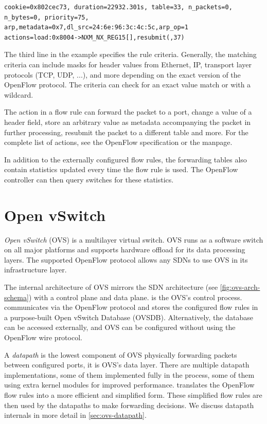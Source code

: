 \begin{verbatim}
cookie=0x802cec73, duration=22932.301s, table=33, n_packets=0,
n_bytes=0, priority=75,
arp,metadata=0x7,dl_src=24:6e:96:3c:4c:5c,arp_op=1
actions=load:0x8004->NXM_NX_REG15[],resubmit(,37)
\end{verbatim}

The third line in the example specifies the rule criteria. Generally, the matching criteria can include masks for header values from Ethernet, IP, transport layer protocols (TCP, UDP, ...), and more depending on the exact version of the OpenFlow protocol. The criteria can check for an exact value match or with a wildcard.

The action in a flow rule can forward the packet to a port, change a value of a header field, store an arbitrary value as metadata accompanying the packet in further processing, resubmit the packet to a different table and more. For the complete list of actions, see the OpenFlow specification  or the  manpage.

In addition to the externally configured flow rules, the forwarding tables also contain statistics updated every time the flow rule is used. The OpenFlow controller can then query switches for these statistics.

\section{Open vSwitch}
\label{sec:ovs}

\emph{Open vSwitch} (OVS) is a multilayer virtual switch. OVS runs as a software switch on all major platforms and supports hardware offload for its data processing layers. The supported OpenFlow protocol allows any SDNs to use OVS in its infrastructure layer.

The internal architecture of OVS mirrors the SDN architecture (see \cref{fig:ovs-arch-schema}) with a control plane and data plane.  is the OVS's control process.  communicates via the OpenFlow protocol and stores the configured flow rules in a purpose-built Open vSwitch Database (OVSDB). Alternatively, the database can be accessed externally, and OVS can be configured without using the OpenFlow wire protocol.

A \emph{datapath} is the lowest component of OVS physically forwarding packets between configured ports, it is OVS's data layer. There are multiple datapath implementations, some of them implemented fully in the  process, some of them using extra kernel modules for improved performance.  translates the OpenFlow flow rules into a more efficient and simplified form. These simplified flow rules are then used by the datapaths to make forwarding decisions. We discuss datapath internals in more detail in \cref{sec:ovs-datapath}.

